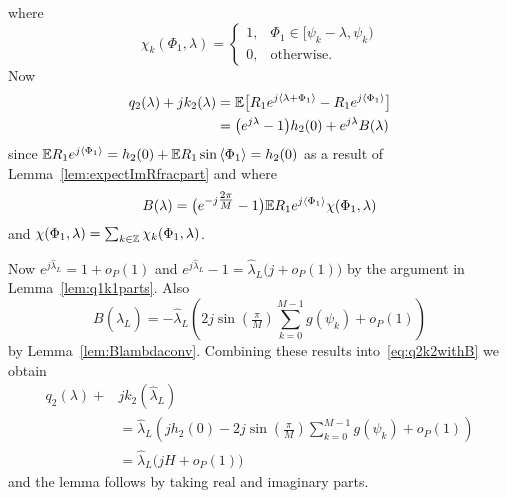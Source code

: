 \documentclass[journal]{IEEEtran}
\begin{document}
\begin{IEEEproof}
where 
\[
\chi_k(\Phi_1,\lambda) = \begin{cases}
1, & \Phi_1 \in [\psi_{k} - \lambda, \psi_k)  \\
0, & \text{otherwise}.
\end{cases}
\]
Now
\begin{align}
q_2(\lambda) + j k_2(\lambda) &= {\mathbb E}\big[ R_1 e^{j\left\langle \lambda + \Phi_1 \right\rangle} - R_1 e^{j\left\langle \Phi_1 \right\rangle}  \big] \nonumber \\
&= \big(e^{j\lambda} - 1 \big) h_2(0)  + e^{j\lambda} B(\lambda) \label{eq:q2k2withB}
\end{align}
since ${\mathbb E} R_1 e^{j\left\langle \Phi_1 \right\rangle} = h_2(0) + {\mathbb E} R_1 \sin\left\langle \Phi_1 \right\rangle = h_2(0)$ as a result of Lemma~\ref{lem:expectImRfracpart} and where
\begin{equation}\label{eq:Blambdadefn}
B(\lambda) = \big( e^{-j\tfrac{2\pi}{M}} - 1 \big){\mathbb E} R_1 e^{j\left\langle \Phi_1 \right\rangle} \chi(\Phi_1,\lambda)
\end{equation}
and $\chi(\Phi_1, \lambda) = \sum_{k \in {\mathbb Z}}\chi_k(\Phi_1, \lambda)$. 

Now $e^{j\hat{\lambda}_L} = 1 + o_P(1)$ and $e^{j\hat{\lambda}_L} - 1 = \hat{\lambda}_L \big( j  + o_P(1) \big)$ by the argument in Lemma~\ref{lem:q1k1parts}.  Also
\[
B(\hat{\lambda}_L) = -\hat{\lambda}_L\left(2j\sin(\tfrac{\pi}{M}) \sum_{k=0}^{M-1} g(\psi_k) + o_P(1)\right) 
\]
by Lemma~\ref{lem:Blambdaconv}.  Combining these results into~\eqref{eq:q2k2withB} we obtain
\begin{align*}
q_2(\lambda) + &jk_2(\hat{\lambda}_L) \\
&= \hat{\lambda}_L \left( jh_2(0) - 2j\sin(\tfrac{\pi}{M}) \sum_{k=0}^{M-1} g(\psi_k) + o_P(1) \right) \\
&= \hat{\lambda}_L\big( jH + o_P(1) \big)
\end{align*}
and the lemma follows by taking real and imaginary parts.
\end{IEEEproof}
\end{document}
